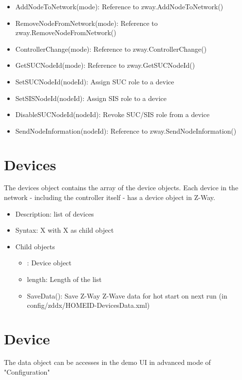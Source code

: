 \begin {itemize}
\begin {itemize}
\item AddNodeToNetwork(mode): Reference to zway.AddNodeToNetwork()
\item RemoveNodeFromNetwork(mode): Reference to zway.RemoveNodeFromNetwork()
\item ControllerChange(mode): Reference to zway.ControllerChange()
\item GetSUCNodeId(mode): Reference to zway.GetSUCNodeId()
\item SetSUCNodeId(nodeId): Assign SUC role to a device
\item SetSISNodeId(nodeId): Assign SIS role to a device
\item DisableSUCNodeId(nodeId): Revoke SUC/SIS role from a device
\item SendNodeInformation(nodeId): Reference to zway.SendNodeInformation()
\end {itemize}
\end {itemize}


\section{Devices}

The devices object contains the array of the device objects. Each device in the network - including the 
controller itself -  has a device object in Z-Way.

\begin {itemize}
\item Description: list of devices
\item Syntax:  X with  X as child object
\item Child objects
\begin {itemize}
\item [m]: Device object
\item length: Length of the list
\item SaveData(): Save Z-Way Z-Wave data for hot start on next run (in config/zddx/HOMEID-DevicesData.xml)
\end {itemize}
\end {itemize}
 

\section{Device}

The data object can be accesses in the demo UI in advanced mode of "Configuration"

